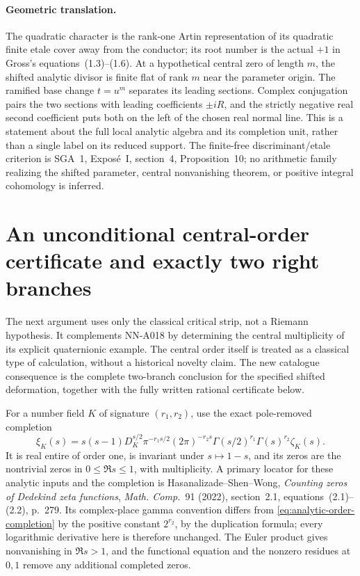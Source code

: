 \paragraph{Geometric translation.}
The quadratic character is the rank-one Artin representation of
its quadratic finite etale cover away from the conductor; its
root number is the actual $+1$ in Gross's equations~(1.3)--(1.6).
At a hypothetical central zero of length $m$, the shifted
analytic divisor is finite flat of rank $m$ near the parameter
origin. The ramified base change $t=u^m$ separates its leading
sections. Complex conjugation pairs the two sections with
leading coefficients $\pm iR$, and the strictly negative real
second coefficient puts both on the left of the chosen real
normal line. This is a statement about the full local analytic
algebra and its completion unit, rather than a single label on
its reduced support. The finite-free discriminant/etale
criterion is SGA~1, Expos\'e~I, section~4, Proposition~10; no
arithmetic family realizing the shifted parameter, central
nonvanishing theorem, or positive integral cohomology is inferred.


\section{An unconditional central-order certificate and exactly two right branches}
\label{sec:analytic-central-order-certificate}

The next argument uses only the classical critical strip, not a
Riemann hypothesis. It complements NN-A018 by determining the
central multiplicity of its explicit quaternionic example.
The central order itself is treated as a classical type of
calculation, without a historical novelty claim. The new
catalogue consequence is the complete two-branch conclusion for
the specified shifted deformation, together with the fully
written rational certificate below.

For a number field $K$ of signature $(r_1,r_2)$, use the exact
pole-removed completion
\begin{equation}\label{eq:analytic-order-completion}
 \xi_K(s)=s(s-1)D_K^{s/2}\pi^{-r_1s/2}(2\pi)^{-r_2s}
        \Gamma(s/2)^{r_1}\Gamma(s)^{r_2}\zeta_K(s).
\end{equation}
It is real entire of order one, is invariant under $s\mapsto1-s$,
and its zeros are the nontrivial zeros in $0\le\Re s\le1$,
with multiplicity. A primary locator for these analytic inputs
and the completion is Hasanalizade--Shen--Wong,
\emph{Counting zeros of Dedekind zeta functions},
\emph{Math. Comp.}~91 (2022), section~2.1, equations~(2.1)--(2.2),
p.~279. Its complex-place gamma convention differs from
\eqref{eq:analytic-order-completion} by the positive constant
$2^{r_2}$, by the duplication formula; every logarithmic
derivative here is therefore unchanged. The Euler product gives
nonvanishing in $\Re s>1$, and the functional equation and the
nonzero residues at $0,1$ remove any additional completed zeros.

